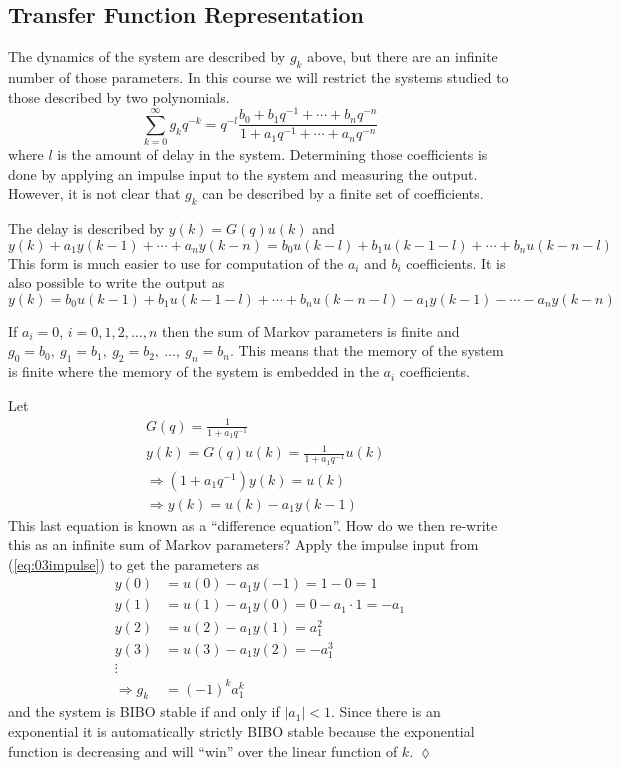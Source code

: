 \subsection{Transfer Function Representation}
The dynamics of the system are described by $g_k$ above, but there are an infinite number of those parameters.
In this course we will restrict the systems studied to those described by two polynomials.
$$\sum_{k=0}^\infty g_k q^{-k} = q^{-l} \frac{b_0 + b_1 q^{-1} + \cdots + b_n q^{-n}}{1+a_1 q^{-1} + \cdots + a_n q^{-n}}$$
where $l$ is the amount of delay in the system.
Determining those coefficients is done by applying an impulse input to the system and measuring the output.
However, it is not clear that $g_k$ can be described by a finite set of coefficients.

The delay is described by $y(k) = G(q)u(k)$ and
$$y(k) + a_1 y(k-1)+\cdots + a_n y(k-n) = b_0 u(k-l)+b_1 u(k-1-l) + \cdots + b_n u(k-n-l)$$
This form is much easier to use for computation of the $a_i$ and $b_i$ coefficients.
It is also possible to write the output as
$$y(k) = b_0 u(k-1) + b_1 u(k-1-l) + \cdots + b_n u(k-n-l) - a_1 y(k-1) - \cdots - a_n y(k-n)$$

If $a_i=0$, $i=0,1,2,\ldots,n$ then the sum of Markov parameters is finite and $g_0=b_0,~g_1=b_1,~g_2=b_2,~\ldots,~g_n=b_n$.
This means that the memory of the system is finite where the memory of the system is embedded in the $a_i$ coefficients.

\begin{example}
Let
\begin{align*}
&G(q) = \frac{1}{1+a_1 q^{-1}} \\
&y(k) = G(q)u(k) = \frac{1}{1+a_1q^{-1}}u(k) \\
&\Rightarrow (1+a_1q^{-1})y(k) = u(k) \\
&\Rightarrow y(k) = u(k) - a_1y(k-1)
\end{align*}
This last equation is known as a ``difference equation''.
How do we then re-write this as an infinite sum of Markov parameters? Apply the impulse input from (\ref{eq:03impulse}) to get the parameters as
\begin{align*}
y(0) &= u(0) - a_1y(-1) = 1-0 = 1 \\
y(1) &= u(1) - a_1y(0) = 0 - a_1 \cdot 1 = -a_1 \\
y(2) &= u(2) - a_1y(1) = a_1^2 \\
y(3) &= u(3) - a_1y(2) = -a_1^3 \\
\vdots & \\
\Rightarrow g_k &= {(-1)}^k a_1^k
\end{align*}
and the system is BIBO stable if and only if $|a_1|<1$.
Since there is an exponential it is automatically strictly BIBO stable because the exponential function is decreasing and will ``win'' over the linear function of $k$.
$\lozenge$
\end{example}

